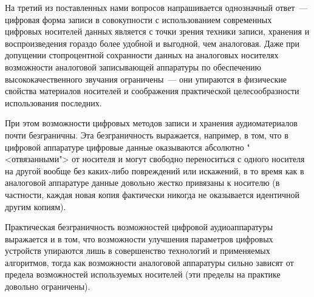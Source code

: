 \documentclass[oneside, final, 14pt]{extreport}
\begin{document}
На третий из поставленных нами вопросов напрашивается однозначный ответ~--- цифровая форма записи в совокупности с использованием современных цифровых носителей данных является с точки зрения техники записи, хранения и воспроизведения гораздо более удобной и выгодной, чем аналоговая. Даже при допущении стопроцентной сохранности данных на аналоговых носителях возможности аналоговой записывающей аппаратуры по обеспечению высококачественного звучания ограничены~--- они упираются в физические свойства материалов носителей и соображения практической целесообразности использования последних. 

При этом возможности цифровых методов записи и хранения аудиоматериалов почти безграничны. Эта безграничность выражается, например, в том, что в цифровой аппаратуре цифровые данные оказываются абсолютно "<отвязанными"> от носителя и могут свободно переноситься с одного носителя на другой вообще без каких-либо повреждений или искажений, в то время как в аналоговой аппаратуре данные довольно жестко привязаны к носителю (в частности, каждая новая копия фактически никогда не оказывается идентичной другим копиям). 

Практическая безграничность возможностей цифровой аудиоаппаратуры выражается и в том, что возможности улучшения параметров цифровых устройств упираются лишь в совершенство технологий и применяемых алгоритмов, тогда как возможности аналоговой аппаратуры сильно зависят от предела возможностей используемых носителей (эти пределы на практике довольно ограничены).
\end{document}
